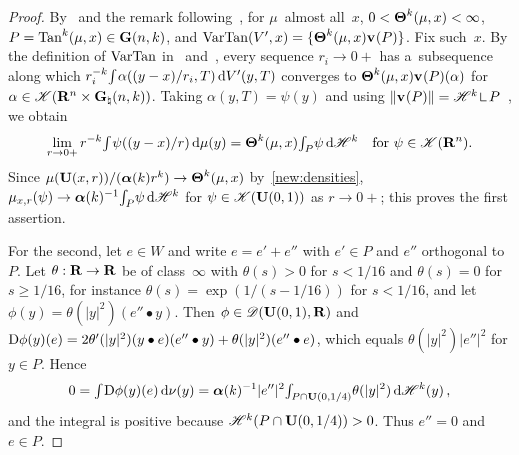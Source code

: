 \documentclass[a4paper,twoside,leqno]{article}
\newcommand{\Gk}{\pgrass{\adim}{\vdim}}        %
\begin{document}
\begin{proof}
    By~\cite[3.5(1)(a)]{Allard1972} and the remark following~\cite[3.5(1)]{Allard1972}, for
    $\mu$~almost all~$x$, $0 < \boldsymbol{\Theta}^{k}(\mu,x) < \infty$, $P = \operatorname{Tan}^{k}(\mu,x) \in
    \mathbf{G}(n,k)$, and $\operatorname{VarTan}(V',x) = \{ \boldsymbol{\Theta}^{k}(\mu,x) \mathbf{v}_{}(P) \}$. Fix
    such~$x$. By the definition of $\operatorname{VarTan}$ in~\cite[3.4]{Allard1972}
    and~\cite[3.4(1), 2.6(2)(a)]{Allard1972}, every sequence $r_i \to 0+$ has a~subsequence along
    which $r_i^{-k} {\textstyle\int_{}^{}} \alpha((y - x)/r_i, T) \,\mathrm{d} V'(y,T)$ converges to
    $\boldsymbol{\Theta}^{k}(\mu,x) \mathbf{v}_{}(P)(\alpha)$ for $\alpha \in \ccspace{\R^{\adim} \times \Gk}$.
    Taking $\alpha(y,T) = \psi(y)$ and using $\|\var{}(P)\| = \HM^{\vdim} \restrict
    P$~\cite[3.5]{Allard1972}, we obtain
    \begin{displaymath}
        \lim_{r \to 0+} r^{-k} {\textstyle\int_{}^{}} \psi((y - x)/r) \,\mathrm{d} \mu(y) =
        \boldsymbol{\Theta}^{k}(\mu,x) {\textstyle\int_{P}^{}} \psi \,\mathrm{d} \mathscr{H}^{k} \quad \text{for $\psi \in
        \mathscr{K}(\mathbf{R}^{n})$}.
    \end{displaymath}
    Since $\mu(\mathbf{U}(x,r)) / (\boldsymbol{\alpha}(k) r^{k}) \to \boldsymbol{\Theta}^{k}(\mu,x)$
    by~\ref{new:densities}, $\mu_{x,r}(\psi) \to \boldsymbol{\alpha}(k)^{-1} {\textstyle\int_{P}^{}} \psi \,\mathrm{d}
    \mathscr{H}^{k}$ for $\psi \in \mathscr{K}(\mathbf{U}(0,1))$ as $r \to 0+$; this proves the first
    assertion.

    For the second, let $e \in W$ and write $e = e' + e''$ with $e' \in P$ and $e''$ orthogonal
    to~$P$. Let $\theta : \mathbf{R} \to \mathbf{R}$ be of class~$\infty$ with $\theta(s) > 0$ for $s < 1/16$ and
    $\theta(s) = 0$ for $s \ge 1/16$, for instance $\theta(s) = \exp(1/(s - 1/16))$ for $s < 1/16$,
    and let $\phi(y) = \theta(|y|^2) (e'' \bullet y)$. Then $\phi \in \mathscr{D}(\mathbf{U}(0,1),\mathbf{R})$ and
    $\mathrm{D} \phi(y)(e) = 2 \theta'(|y|^2) (y \bullet e)(e'' \bullet y) + \theta(|y|^2) (e'' \bullet
    e)$, which equals $\theta(|y|^2) |e''|^2$ for $y \in P$. Hence
    \begin{displaymath}
        0 = {\textstyle\int_{}^{}} \mathrm{D} \phi(y)(e) \,\mathrm{d} \nu(y) = \boldsymbol{\alpha}(k)^{-1} |e''|^2 {\textstyle\int_{P
        \cap \mathbf{U}(0,1/4)}^{}} \theta(|y|^2) \,\mathrm{d} \mathscr{H}^{k}(y) \,,
    \end{displaymath}
    and the integral is positive because $\mathscr{H}^{k}(P \cap \mathbf{U}(0,1/4)) > 0$. Thus $e'' = 0$
    and $e \in P$.
\end{proof}
\end{document}

